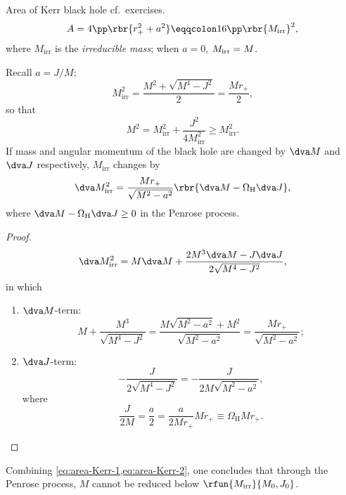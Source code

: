 \begin{nameddef}{Area of Kerr black hole}
cf.\ exercises.
\begin{equation}
A = 4\pp \rbr{r_+^2 + a^2} \eqqcolon 16\pp\rbr{M_\text{irr}}^2,
\label{eq:area-Kerr}
\end{equation}
where $M_\text{irr}$ is the \emph{irreducible mass}; when $a = 0$, $M_%
\text{irr} = M$.

Recall $a = J/M$;
\begin{equation}
M_\text{irr}^2 = \frac{M^2 + \sqrt{M^4 - J^2}}{2} = \frac{Mr_+}{2},
\end{equation}
so that
\begin{equation}
M^2 = M_\text{irr}^2 + \frac{J^2}{4M_\text{irr}^2} \ge M_\text{irr}^2.
\label{eq:area-Kerr-1}
\end{equation}
If mass and angular momentum of the black hole are changed by $\dva M$
and $\dva J$ respectively, $M_\text{irr}$ changes by
\begin{equation}
\dva M_\text{irr}^2 = \frac{Mr_+}{\sqrt{M^2-a^2}}\rbr{\dva M -
\Omega_\text{H}\dva J},
\label{eq:area-Kerr-2}
\end{equation}
where $\dva M - \Omega_\text{H}\dva J \ge 0$ in the Penrose process.
\begin{proof}
\begin{equation}
\dva M_\text{irr}^2 = M\dva M + \frac{2M^3\dva M - J \dva J}%
{2\sqrt{M^4 - J^2}},
\end{equation}
in which
\begin{enumerate}
\item
$\dva M$-term:
\begin{equation}
M + \frac{M^3}{\sqrt{M^4 - J^2}} = \frac{M\sqrt{M^2 - a^2} + M^2}%
{\sqrt{M^2 - a^2}} = \frac{M r_+}{\sqrt{M^2 - a^2}};
\end{equation}
\item
$\dva J$-term:
\begin{equation}
-\frac{J}{2\sqrt{M^4-J^2}} = -\frac{J}{2M\sqrt{M^2-a^2}},
\end{equation}
where
\begin{equation}
\frac{J}{2M} = \frac{a}{2} = \frac{a}{2Mr_+} Mr_+ \equiv \Omega_\text{H} Mr_+.
\end{equation}
\end{enumerate}
\end{proof}
Combining \cref{eq:area-Kerr-1,eq:area-Kerr-2}, one concludes that through the
Penrose process, $M$ cannot be reduced below $\rfun{M_\text{irr}}{M_0, J_0}$.


\end{nameddef}
